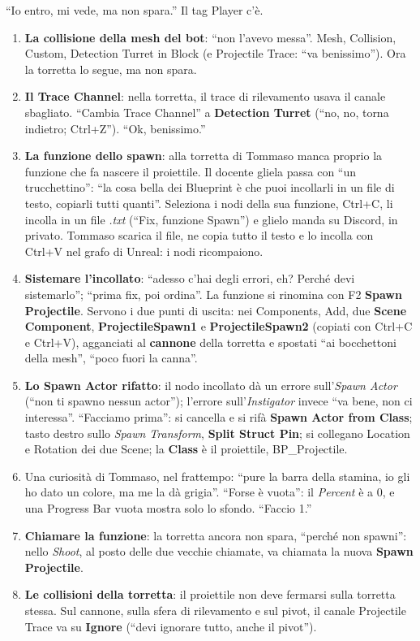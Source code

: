 ``Io entro, mi vede, ma non spara.'' Il tag Player c'è.
\begin{enumerate}
  \item \textbf{La collisione della mesh del bot}: ``non l'avevo messa''. Mesh, Collision,
        Custom, Detection Turret in Block (e Projectile Trace: ``va benissimo''). Ora la
        torretta lo segue, ma non spara.
  \item \textbf{Il Trace Channel}: nella torretta, il trace di rilevamento usava il canale
        sbagliato. ``Cambia Trace Channel'' a \textbf{Detection Turret} (``no, no, torna
        indietro; Ctrl+Z''). ``Ok, benissimo.''
  \item \textbf{La funzione dello spawn}: alla torretta di Tommaso manca proprio la
        funzione che fa nascere il proiettile. Il docente gliela passa con ``un
        trucchettino'': ``la cosa bella dei Blueprint è che puoi incollarli in un file di
        testo, copiarli tutti quanti''. Seleziona i nodi della sua funzione, Ctrl+C, li
        incolla in un file \emph{.txt} (``Fix, funzione Spawn'') e glielo manda su
        Discord, in privato. Tommaso scarica il file, ne copia tutto il testo e lo incolla
        con Ctrl+V nel grafo di Unreal: i nodi ricompaiono.
  \item \textbf{Sistemare l'incollato}: ``adesso c'hai degli errori, eh? Perché devi
        sistemarlo''; ``prima fix, poi ordina''. La funzione si rinomina con F2
        \textbf{Spawn Projectile}. Servono i due punti di uscita: nei Components, Add,
        due \textbf{Scene Component}, \textbf{ProjectileSpawn1} e \textbf{ProjectileSpawn2}
        (copiati con Ctrl+C e Ctrl+V), agganciati al \textbf{cannone} della torretta e
        spostati ``ai bocchettoni della mesh'', ``poco fuori la canna''.
  \item \textbf{Lo Spawn Actor rifatto}: il nodo incollato dà un errore sull'\emph{Spawn
        Actor} (``non ti spawno nessun actor''); l'errore sull'\emph{Instigator} invece
        ``va bene, non ci interessa''. ``Facciamo prima'': si cancella e si rifà
        \textbf{Spawn Actor from Class}; tasto destro sullo \emph{Spawn Transform},
        \textbf{Split Struct Pin}; si collegano Location e Rotation dei due Scene; la
        \textbf{Class} è il proiettile, BP\_Projectile.
  \item Una curiosità di Tommaso, nel frattempo: ``pure la barra della stamina, io gli ho
        dato un colore, ma me la dà grigia''. ``Forse è vuota'': il \emph{Percent} è a 0,
        e una Progress Bar vuota mostra solo lo sfondo. ``Faccio 1.''
  \item \textbf{Chiamare la funzione}: la torretta ancora non spara, ``perché non
        spawni'': nello \emph{Shoot}, al posto delle due vecchie chiamate, va chiamata la
        nuova \textbf{Spawn Projectile}.
  \item \textbf{Le collisioni della torretta}: il proiettile non deve fermarsi sulla
        torretta stessa. Sul cannone, sulla sfera di rilevamento e sul pivot, il canale
        Projectile Trace va su \textbf{Ignore} (``devi ignorare tutto, anche il pivot'').
\end{enumerate}
